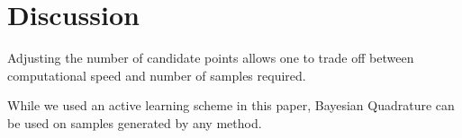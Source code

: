 \documentclass{article}
\newlength\fheight  %
\newlength\fwidth
\begin{document}
% 	 
% 	
% 
% 
% 
% 






\section{Discussion}

Adjusting the number of candidate points allows one to trade off between computational speed and number of samples required.

While we used an active learning scheme in this paper, Bayesian Quadrature can be used on samples generated by any method.
\end{document}
